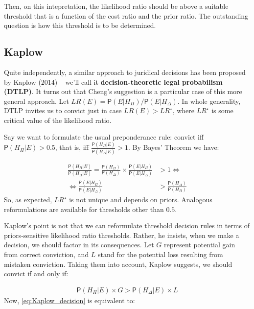 \documentclass[10pt,dvipsnames,enabledeprecatedfontcommands]{scrartcl}
\newcommand{\pr}[1]{\mathsf{P}(#1)}
\begin{document}
Then, on this intepretation, the likelihood ratio should be above a
suitable threshold that is a function of the cost ratio and the prior
ratio. The outstanding question is how this threshold is to be
determined.

\hypertarget{kaplow}{%
\subsection{Kaplow}\label{kaplow}}

Quite independently, a similar approach to juridical decisions has been
proposed by Kaplow (2014) -- we'll call it
\textbf{decision-theoretic legal probabilism (DTLP)}. It turns out that
Cheng's suggestion is a particular case of this more general approach.
Let \(LR(E)=\pr{E\vert H_\Pi}/\pr{E\vert H_\Delta}\). In whole
generality, DTLP invites us to convict just in case \(LR(E)>LR^\star\),
where \(LR^\star\) is some critical value of the likelihood ratio.

Say we want to formulate the usual preponderance rule: convict iff
\(\pr{H_\Pi\vert E}>0.5\), that is, iff
\(\frac{\pr{H_\Pi\vert E}}{\pr{H_\Delta\vert E}}>1\). By Bayes' Theorem
we have:

\vspace{-6mm}

\begin{align*}
\frac{\pr{H_\Pi\vert E}}{\pr{H_\Delta\vert E}} =  \frac{\pr{H_\Pi}}{\pr{H_\Delta}}\times \frac{\pr{E\vert H_\Pi}}{\pr{E\vert H_\Delta}} &>1 \Leftrightarrow\\
  \Leftrightarrow \frac{\pr{E\vert H_\Pi}}{\pr{E\vert H_\Delta}} &> \frac{\pr{H_\Delta}}{\pr{H_\Pi}} 
 \end{align*} \noindent So, as expected, \(LR^\star\) is not unique and
depends on priors. Analogous reformulations are available for thresholds
other than \(0.5\).

Kaplow's point is not that we can reformulate threshold decision rules
in terms of priors-sensitive likelihood ratio thresholds. Rather, he
insists, when we make a decision, we should factor in its consequences.
Let \(G\) represent potential gain from correct conviction, and \(L\)
stand for the potential loss resulting from mistaken conviction. Taking
them into account, Kaplow suggests, we should convict if and only if:

\vspace{-6mm}

\begin{align}
\label{eq:Kaplow_decision}
\pr{H_\Pi\vert E}\times G > \pr{H_\Delta\vert E}\times L
\end{align} \noindent Now, \eqref{eq:Kaplow_decision} is equivalent to:
\end{document}
